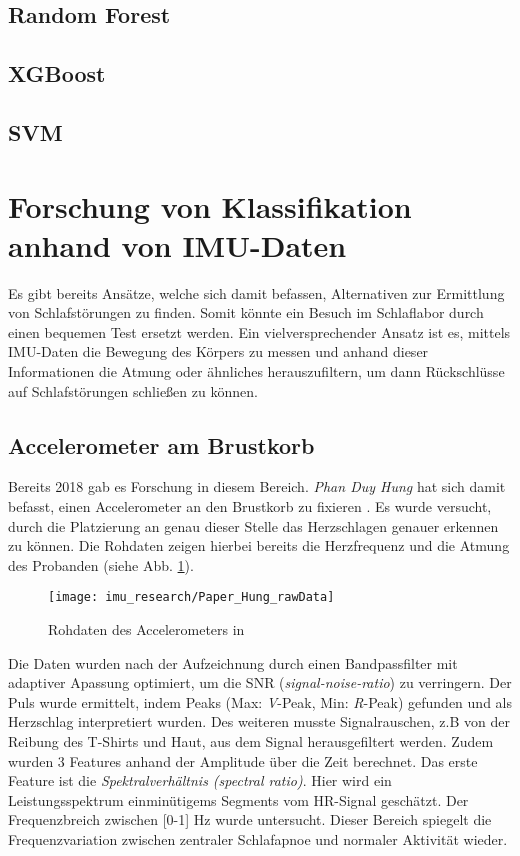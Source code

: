 \subsection{Random Forest}

\subsection{XGBoost}

\subsection{SVM}


\section{Forschung von Klassifikation anhand von IMU-Daten}
Es gibt bereits Ansätze, welche sich damit befassen, Alternativen zur Ermittlung von Schlafstörungen zu finden. 
Somit könnte ein Besuch im Schlaflabor durch einen bequemen Test ersetzt werden. 
Ein vielversprechender Ansatz ist es, mittels IMU-Daten die Bewegung des Körpers zu messen und anhand dieser Informationen die Atmung oder ähnliches herauszufiltern, um dann Rückschlüsse auf Schlafstörungen schließen zu können.

\subsection{Accelerometer am Brustkorb}
Bereits 2018 gab es Forschung in diesem Bereich. \textit{Phan Duy Hung} hat sich damit befasst, einen Accelerometer an den Brustkorb zu fixieren \cite{hung_central_2018}.
Es wurde versucht, durch die Platzierung an genau dieser Stelle das Herzschlagen genauer erkennen zu können. 
Die Rohdaten zeigen hierbei bereits die Herzfrequenz und die Atmung des Probanden (siehe Abb. \ref{imu_research_hung_rawData}).

\begin{figure}[ht]
    \centering
    \texttt{[image: imu\_research/Paper\_Hung\_rawData]}
    \caption{Rohdaten des Accelerometers in \cite{hung_central_2018}}
    \label{imu_research_hung_rawData}
\end{figure}

Die Daten wurden nach der Aufzeichnung durch einen Bandpassfilter mit adaptiver Apassung optimiert, um die SNR (\textit{signal-noise-ratio}) zu verringern.
Der Puls wurde ermittelt, indem Peaks (Max: \textit{V}-Peak, Min: \textit{R}-Peak) gefunden und als Herzschlag interpretiert wurden.
Des weiteren musste Signalrauschen, z.B von der Reibung des T-Shirts und Haut, aus dem Signal herausgefiltert werden. 
Zudem wurden 3 Features anhand der Amplitude über die Zeit berechnet. 
Das erste Feature ist die \textit{Spektralverhältnis (spectral ratio)}. 
Hier wird ein Leistungsspektrum einminütigems Segments vom HR-Signal geschätzt. 
Der Frequenzbreich zwischen [0-1] $\si{\hertz}$ wurde untersucht. 
Dieser Bereich spiegelt die Frequenzvariation zwischen zentraler Schlafapnoe und normaler Aktivität wieder.

